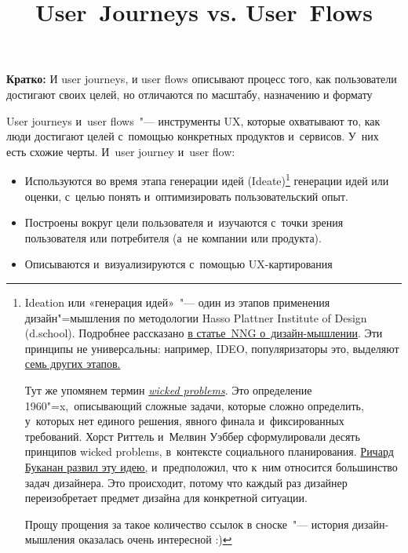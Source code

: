 \documentclass[12pt]{article}
\begin{document}
\title{User~Journeys vs. User~Flows}



\begin{leftbar}
	\large{\textbf{Кратко:} И user journeys, и user flows описывают процесс того, как пользователи достигают своих целей, но отличаются по масштабу, назначению и формату}
\end{leftbar}

User journeys и~user flows~"--- инструменты UX, которые охватывают то, как люди достигают целей с~помощью конкретных продуктов и~сервисов. У~них есть схожие черты. И~user journey и~user flow:
   
\begin{itemize}
	\item Используются во время этапа генерации идей (Ideate)\footnote{Ideation или «генерация идей»~"--- один из этапов применения дизайн"=мышления по методологии Hasso Plattner Institute of Design (d.school). Подробнее рассказано \href{https://www.nngroup.com/articles/design"=thinking/}{в статье~NNG о~дизайн-мышлении}. Эти принципы не универсальны: например, IDEO, популяризаторы это, выделяют \href{https://designthinking.ideo.com/process}{семь других этапов.}
	\par
	Тут же упомянем термин \textit{\href{https://www.sympoetic.net/Managing\_Complexity/complexity\_files/1973\%20Rittel\%20and\%20Webber\%20Wicked\%20Problems.pdf}{wicked problems}}. Это определение 1960"=x,~описывающий сложные задачи, которые сложно определить, у~которых нет единого решения, явного финала и~фиксированных требований. Хорст Риттель и~Мелвин Уэббер сформулировали десять принципов wicked problems, в~контексте социального планирования. \href{https://www.researchgate.net/publication/251880127\_Wicked\_Problems\_in\_Design\_Thinking}{Ричард Буканан развил эту идею,} и~предположил, что к~ним относится большинство задач дизайнера. Это происходит, потому что каждый раз дизайнер переизобретает предмет дизайна для конкретной ситуации.
	\par
	Прощу прощения за такое количество ссылок в сноске~"--- история дизайн-мышления оказалась очень интересной :)} генерации идей или оценки, с~целью понять и~оптимизировать пользовательский опыт.
	\item Построены вокруг цели пользователя и~изучаются с~точки зрения пользователя или потребителя (а~не компании или продукта).
	\item Описываются и~визуализируются с~помощью UX-картирования
\end{itemize}
\end{document}
